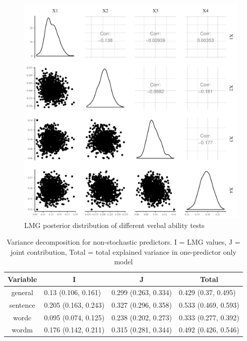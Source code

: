 \documentclass[11pt,a4paper,twoside]{book}\usepackage[]{graphicx}\usepackage[]{color}
\makeatletter
\def\maxwidth{ %
  \ifdim\Gin@nat@width>\linewidth
    \linewidth
  \else
    \Gin@nat@width
  \fi
}
\newenvironment{knitrout}{}{} %
\makeatother
\begin{document}
\begin{knitrout}
\color{fgcolor}\begin{figure}
\includegraphics[width=\maxwidth]{figure/ch03_figempi_lmg_plot-1} \caption[LMG posterior distribution of different verbal ability tests]{LMG posterior distribution of different verbal ability tests}\label{fig:empi.lmg.plot}
\end{figure}


\end{knitrout}


\begin{table}[h]
\caption{Variance decomposition for non-stochastic predictors. I = LMG values, J = joint contribution, Total = total explained variance in one-predictor only model}
\centering
\begin{tabular}{clll}
  \toprule
  \multicolumn{1}{c}{\textbf{Variable}} & \multicolumn{1}{c}{\textbf{I}} &\multicolumn{1}{c}{\textbf{J}} & \multicolumn{1}{c}{\textbf{Total}} \\
  \hline
general & 0.13 (0.106, 0.161)  & 0.299 (0.263, 0.334)   & 0.429 (0.37, 0.495)  \\ 
sentence & 0.205 (0.163, 0.243)  & 0.327 (0.296, 0.358)   & 0.533 (0.469, 0.593)  \\ 
wordc & 0.095 (0.074, 0.125)  & 0.238 (0.202, 0.273)   & 0.333 (0.277, 0.392)  \\ 
wordm & 0.176 (0.142, 0.211)  & 0.315 (0.281, 0.344)   & 0.492 (0.426, 0.546)  \\ 
   \bottomrule
\end{tabular}
\label{tbl:empirical.ijt}
\end{table}
\end{document}
